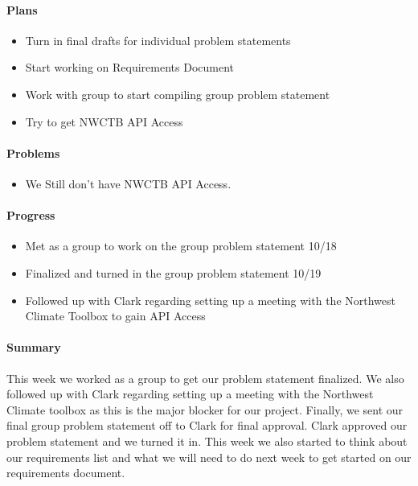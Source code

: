 \documentclass[onecolumn, draftclsnofoot,10pt, compsoc]{article}
\begin{document}
		    \paragraph{Plans} \hfill \break
		        
		        \begin{itemize}
		            \item Turn in final drafts for individual problem statements
		            \item Start working on Requirements Document
		            \item Work with group to start compiling group problem statement
		            \item Try to get NWCTB API Access
		        \end{itemize}
		        
		    \paragraph{Problems} \hfill \break
		        
		        \begin{itemize}
		            \item We Still don't have NWCTB API Access.
		        \end{itemize}
		        
		    \paragraph{Progress} \hfill \break
		    
		        \begin{itemize}
		            \item Met as a group to work on the group problem statement 10/18
		            \item Finalized and turned in the group problem statement 10/19
		            \item Followed up with Clark regarding setting up a meeting with the Northwest Climate Toolbox to gain API Access
		        \end{itemize}
		        
		        \paragraph{Summary}
		            This week we worked as a group to get our problem statement finalized. We also followed up with Clark regarding setting up a meeting with the Northwest Climate toolbox as this is the major blocker for our project. Finally, we sent our final group problem statement off to Clark for final approval. Clark approved our problem statement and we turned it in. This week we also started to think about our requirements list and what we will need to do next week to get started on our requirements document.\\
		    
\end{document}
